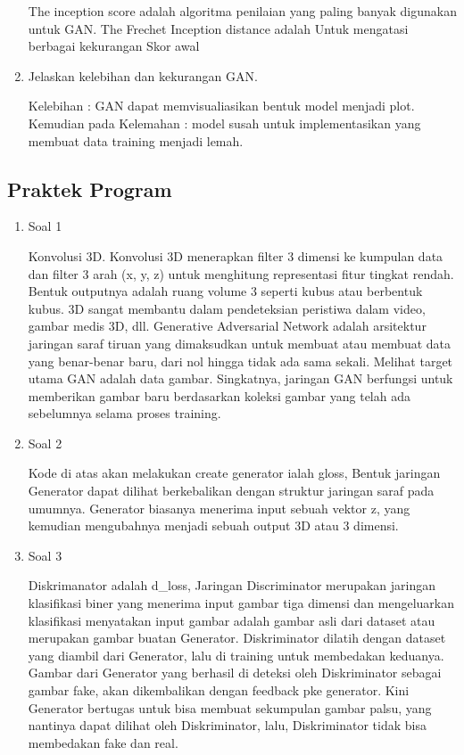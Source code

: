 \begin{enumerate}
	The inception score adalah algoritma penilaian yang paling banyak digunakan untuk GAN. The Frechet Inception distance adalah Untuk mengatasi berbagai kekurangan Skor awal

	\item Jelaskan kelebihan dan kekurangan GAN.
	\hfill\break

	Kelebihan : GAN dapat memvisualiasikan bentuk model menjadi plot. Kemudian pada Kelemahan : model susah untuk implementasikan yang membuat data training menjadi lemah.

\end{enumerate}

\subsection{Praktek Program}
\begin{enumerate}
	\item Soal 1
	\hfill\break

	Konvolusi 3D. Konvolusi 3D menerapkan filter 3 dimensi ke kumpulan data dan filter 3 arah (x, y, z) untuk menghitung representasi fitur tingkat rendah. Bentuk outputnya adalah ruang volume 3 seperti kubus atau berbentuk kubus. 3D sangat membantu dalam pendeteksian peristiwa dalam video, gambar medis 3D, dll. Generative Adversarial Network adalah arsitektur jaringan saraf tiruan yang dimaksudkan untuk membuat atau membuat data yang benar-benar baru, dari nol hingga tidak ada sama sekali. Melihat target utama GAN adalah data gambar. Singkatnya, jaringan GAN berfungsi untuk memberikan gambar baru berdasarkan koleksi gambar yang telah ada sebelumnya selama proses training.

	\item Soal 2
	\hfill\break
	
	Kode di atas akan melakukan create generator ialah gloss, Bentuk jaringan Generator dapat dilihat berkebalikan dengan struktur jaringan saraf pada umumnya. Generator biasanya menerima input sebuah vektor z, yang kemudian mengubahnya menjadi sebuah output 3D atau 3 dimensi.

	\item Soal 3
	\hfill\break
	
	Diskrimanator adalah d\_loss, Jaringan Discriminator merupakan jaringan klasifikasi biner yang menerima input gambar tiga dimensi dan mengeluarkan klasifikasi menyatakan input gambar adalah gambar asli dari dataset atau merupakan gambar buatan Generator. Diskriminator dilatih dengan dataset yang diambil dari Generator, lalu di training untuk membedakan keduanya. Gambar dari Generator yang berhasil di deteksi oleh Diskriminator sebagai gambar fake, akan dikembalikan dengan feedback pke generator. Kini Generator bertugas untuk bisa membuat sekumpulan gambar palsu, yang nantinya dapat dilihat oleh Diskriminator, lalu, Diskriminator tidak bisa membedakan fake dan real.


\end{enumerate}
